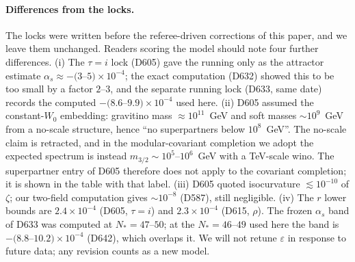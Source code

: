 \documentclass[aps,prd,twocolumn,superscriptaddress,nofootinbib,floatfix]{revtex4-2}
\begin{document}
\paragraph{Differences from the locks.} The locks were written before the referee-driven corrections of this paper, and we leave them unchanged. Readers scoring the model should note four further differences. (i) The $\tau=i$ lock (D605) gave the running only as the attractor estimate $\alpha_s\approx-(3$--$5)\times10^{-4}$; the exact computation (D632) showed this to be too small by a factor $2$--$3$, and the separate running lock (D633, same date) records the computed $-(8.6$--$9.9)\times10^{-4}$ used here. (ii) D605 assumed the constant-$W_0$ embedding: gravitino mass $\approx10^{11}$~GeV and soft masses $\sim10^9$~GeV from a no-scale structure, hence ``no superpartners below $10^8$~GeV''. The no-scale claim is retracted, and in the modular-covariant completion we adopt the expected spectrum is instead $m_{3/2}\sim10^5$--$10^6$~GeV with a TeV-scale wino. The superpartner entry of D605 therefore does not apply to the covariant completion; it is shown in the table with that label. (iii) D605 quoted isocurvature $\lesssim10^{-10}$ of $\zeta$; our two-field computation gives $\sim10^{-8}$ (D587), still negligible. (iv) The $r$ lower bounds are $2.4\times10^{-4}$ (D605, $\tau=i$) and $2.3\times10^{-4}$ (D615, $\rho$). The frozen $\alpha_s$ band of D633 was computed at $N_*=47$--$50$; at the $N_*=46$--$49$ used here the band is $-(8.8$--$10.2)\times10^{-4}$ (D642), which overlaps it. We will not retune $\varepsilon$ in response to future data; any revision counts as a new model.
\end{document}
